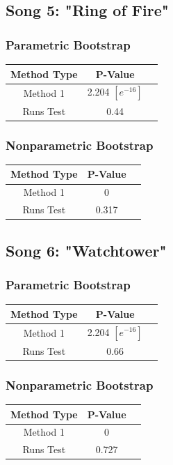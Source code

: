 \documentclass[12pt, letterpaper]{article}
\begin{document}
\subsection{Song 5: "Ring of Fire"}
\subsubsection{Parametric Bootstrap}
\begin{tabular}{|c|c|c|}
\hline
\textbf{Method Type} & P-Value  \\
\hline
Method 1 & 2.204 $[e^{-16}]$ \\
\hline
Runs Test & 0.44 \\ 
\hline
\end{tabular}

\subsubsection{Nonparametric Bootstrap}
\begin{tabular}{|c|c|c|}
\hline
\textbf{Method Type} & P-Value \\
\hline
Method 1 & 0  \\
\hline
Runs Test & 0.317 \\ 
\hline
\end{tabular}

\subsection{Song 6: "Watchtower"}
\subsubsection{Parametric Bootstrap}
\begin{tabular}{|c|c|c|}
\hline
\textbf{Method Type} & P-Value  \\
\hline
Method 1 & 2.204 $[e^{-16}]$ \\
\hline
Runs Test & 0.66 \\ 
\hline
\end{tabular}

\subsubsection{Nonparametric Bootstrap}
\begin{tabular}{|c|c|c|}
\hline
\textbf{Method Type} & P-Value \\
\hline
Method 1 & 0  \\
\hline
Runs Test & 0.727 \\ 
\hline
\end{tabular}
\end{document}
